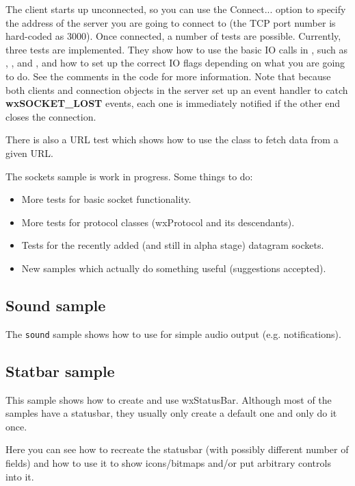 The client starts up unconnected, so you can use the Connect... option
to specify the address of the server you are going to connect to (the
TCP port number is hard-coded as 3000). Once connected, a number of
tests are possible. Currently, three tests are implemented. They show
how to use the basic IO calls in ,
such as , ,
 and ,
and how to set up the correct IO flags depending on what you are going to
do. See the comments in the code for more information. Note that because
both clients and connection objects in the server set up an event handler
to catch {\bf wxSOCKET\_LOST} events, each one is immediately notified
if the other end closes the connection.

There is also a URL test which shows how to use
the  class to fetch data from a given URL.

The sockets sample is work in progress. Some things to do:

\begin{itemize}\itemsep=0pt
\item More tests for basic socket functionality.
\item More tests for protocol classes (wxProtocol and its descendants).
\item Tests for the recently added (and still in alpha stage) datagram sockets.
\item New samples which actually do something useful (suggestions accepted).
\end{itemize}


\subsection{Sound sample}\label{samplesound}

The {\tt sound} sample shows how to use  for simple
audio output (e.g. notifications).


\subsection{Statbar sample}\label{samplestatbar}

This sample shows how to create and use wxStatusBar. Although most of the
samples have a statusbar, they usually only create a default one and only
do it once.

Here you can see how to recreate the statusbar (with possibly different number
of fields) and how to use it to show icons/bitmaps and/or put arbitrary
controls into it.


